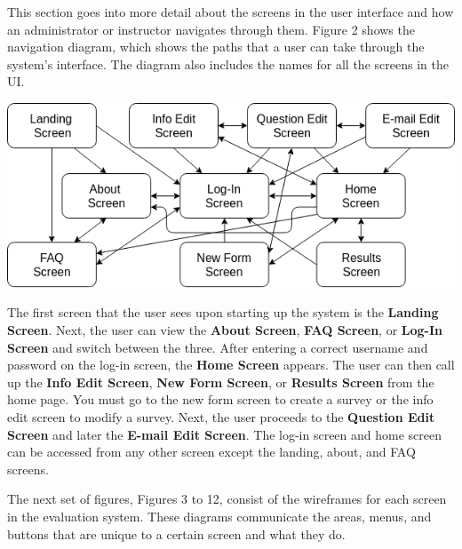 \documentclass{article}
\begin{document}
This section goes into more detail about the screens in the user interface and how an administrator or instructor navigates through them. Figure 2 shows the navigation diagram, which shows the paths that a user can take through the system's interface. The diagram also includes the names for all the screens in the UI.

\begin{center}
\vspace{3mm}
{\includegraphics[width=6.5in]{images/navigation_diagram.png}}
\vspace{2mm}
\end{center} 

The first screen that the user sees upon starting up the system is the \textbf{Landing Screen}. Next, the user can view the \textbf{About Screen}, \textbf{FAQ Screen}, or  \textbf{Log-In Screen} and switch between the three. After entering a correct username and password on the log-in screen, the \textbf{Home Screen} appears. The user can then call up the \textbf{Info Edit Screen}, \textbf{New Form Screen}, or \textbf{Results Screen} from the home page. You must go to the new form screen to create a survey or the info edit screen to modify a survey. Next, the user proceeds to the \textbf{Question Edit Screen} and later the \textbf{E-mail Edit Screen}. The log-in screen and home screen can be accessed from any other screen except the landing, about, and FAQ screens.

The next set of figures, Figures 3 to 12, consist of the wireframes for each screen in the evaluation system. These diagrams communicate the areas, menus, and buttons that are unique to a certain screen and what they do.

\newpage
{}
\end{document}
